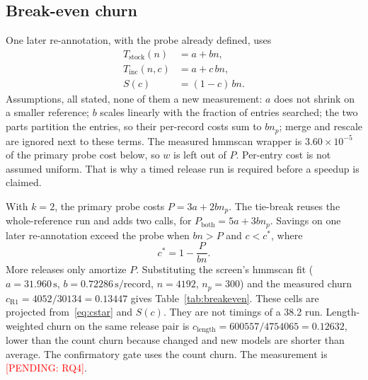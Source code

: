 \documentclass[letterpaper,twocolumn,10pt]{article}
\newcommand{\pending}[1]{\textcolor{red}{[PENDING: #1]}}
\begin{document}
\subsection{Break-even churn}

One later re-annotation, with the probe already defined, uses
\begin{align*}
T_{\mathrm{stock}}(n) &= a + b n, \\
T_{\mathrm{inc}}(n, c) &= a + c\, b n, \\
S(c) &= (1 - c)\, b n .
\end{align*}
Assumptions, all stated, none of them a new measurement:
$a$ does not shrink on a smaller reference;
$b$ scales linearly with the fraction of entries searched;
the two parts partition the entries, so their per-record costs sum to $b n_p$;
merge and rescale are ignored next to these terms.
The measured hmmscan wrapper is
$3.60\times 10^{-5}$
of the primary probe cost below, so $w$ is left out of $P$.
Per-entry cost is not assumed uniform.
That is why a timed release run is required before a speedup is claimed.

With $k = 2$,
the primary probe costs $P = 3a + 2 b n_p$.
The tie-break reuses the whole-reference run and adds two calls, for $P_{\mathrm{both}} = 5a + 3 b n_p$.
Savings on one later re-annotation exceed the probe when $b n > P$ and $c < c^{\ast}$, where
\begin{equation}
c^{\ast} = 1 - \frac{P}{b n}.
\label{eq:cstar}
\end{equation}
More releases only amortize $P$.
Substituting the screen's hmmscan fit
($a = 31.960\,\mathrm{s}$,
$b = 0.72286\,\mathrm{s}/\mathrm{record}$,
$n = 4192$,
$n_p = 300$)
and the measured churn
$c_{\mathrm{R1}} = 4052/30134 = 0.13447$
gives Table~\ref{tab:breakeven}.
These cells are projected from~\eqref{eq:cstar} and $S(c)$.
They are not timings of a 38.2 run.
Length-weighted churn on the same release pair is
$c_{\mathrm{length}} = 600557/4754065 = 0.12632$,
lower than the count churn because changed and new models are shorter than average.
The confirmatory gate uses the count churn.
The measurement is
\pending{RQ4}.
\end{document}
